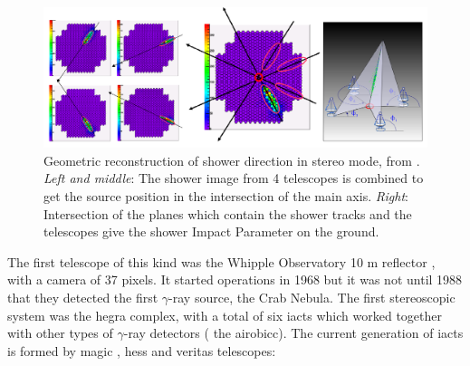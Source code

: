 \documentclass[main.tex]{subfiles}
\begin{document}
\begin{figure}[h]
  \centering
  \includegraphics[width=1\textwidth]{Pictures/stereomode.pdf}
  \caption{Geometric reconstruction of shower direction in stereo mode, from \cite{2015groundbasedtechniques}. \textit{Left and middle}: The shower image from 4 telescopes is combined to get the source position in the intersection of the main axis. \textit{Right}: Intersection of the planes which contain the shower tracks and the telescopes give the shower Impact Parameter on the ground.}
  \label{fig:stereoreco}
\end{figure}

The first telescope of this kind was the Whipple Observatory 10 m reflector \cite{whipple}, with a camera of 37 pixels. It started operations in 1968 but it was not until 1988 that they detected the first $\gamma$-ray source, the Crab Nebula. The first stereoscopic system was the \gls{hegra} complex, with a total of six \glspl{iact} which worked together with other types of $\gamma$-ray detectors ( the \gls{airobicc}).
The current generation of \glspl{iact} is formed by \gls{magic} \cite{2011magic}, \gls{hess} \cite{2018HESS} and \gls{veritas} \cite{2019VERITAS} telescopes:\\
\end{document}
